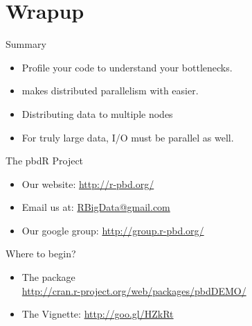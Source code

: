 \section{Wrapup}
\makesubcontentsslides
\hidenum

\begin{frame}
  \begin{block}{Summary}
    \begin{itemize}
      \item Profile your code to understand your bottlenecks.
      \item \pbdR makes distributed parallelism with \R easier.
      \item Distributing data to multiple nodes 
      \item For truly large data, I/O must be parallel as well.
    \end{itemize}
  \end{block}
\end{frame}


\begin{frame}[noframenumbering]
  \begin{block}{The pbdR Project}
    \begin{itemize}
      \item Our website: \url{http://r-pbd.org/}
      \item Email us at: \url{RBigData@gmail.com}
      \item Our google group: \url{http://group.r-pbd.org/}
     \end{itemize}
\end{block}
  \begin{block}{Where to begin?}
    \begin{itemize}
      \item The  package\\
      \url{http://cran.r-project.org/web/packages/pbdDEMO/}\\
      \item The  Vignette: \url{http://goo.gl/HZkRt}
    \end{itemize}
\end{block}
\end{frame}


\section*{}



